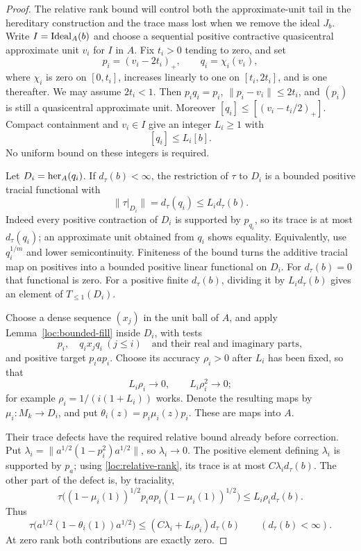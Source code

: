 \begin{proof}
The relative rank bound will control both the approximate-unit tail
in the hereditary construction and the trace mass lost when we remove
the ideal $J_b$.
Write $I=\operatorname{Ideal}_A(b)$ and choose a sequential positive contractive
quasicentral approximate unit $v_i$ for $I$ in $A$.  Fix $t_i>0$
tending to zero, and set
\[
 p_i=(v_i-2t_i)_+,\qquad q_i=\chi_i(v_i),
\]
where $\chi_i$ is zero on $[0,t_i]$, increases linearly to one on
$[t_i,2t_i]$, and is one thereafter.  We may assume $2t_i<1$.
Then $p_iq_i=p_i$, $\|p_i-v_i\|\le2t_i$, and $(p_i)$ is still a
quasicentral approximate unit.  Moreover
$[q_i]\le[(v_i-t_i/2)_+]$.  Compact containment and $v_i\in I$ give
an integer $L_i\ge1$ with
\begin{equation}\label{loc:hereditary-bound}
 [q_i]\le L_i[b].
\end{equation}
No uniform bound on these integers is required.

Let $D_i=\operatorname{her}_A(q_i)$.  If $d_\tau(b)<\infty$, the restriction of
$\tau$ to $D_i$ is a bounded positive tracial functional with
\begin{equation}\label{loc:trace-norm}
 \|\tau|_{D_i}\|=d_\tau(q_i)\le L_i d_\tau(b).
\end{equation}
Indeed every positive contraction of $D_i$ is supported by $p_{q_i}$,
so its trace is at most $d_\tau(q_i)$; an approximate unit obtained
from $q_i$ shows equality.  Equivalently, use $q_i^{1/m}$ and lower
semicontinuity.  Finiteness of the bound turns the additive tracial
map on positives into a bounded positive linear functional on $D_i$.
For $d_\tau(b)=0$ that functional is zero.  For a positive finite
$d_\tau(b)$, dividing it by $L_i d_\tau(b)$ gives an element of
$T_{\leq1}(D_i)$.

Choose a dense sequence $(x_j)$ in the unit ball of $A$, and apply
Lemma~\ref{loc:bounded-fill} inside $D_i$, with tests
\[
 p_i,\quad q_i x_j q_i\ (j\le i)
 \quad\text{and their real and imaginary parts},
\]
and positive target $p_iap_i$.  Choose its accuracy
$\rho_i>0$ after $L_i$ has been fixed, so that
\begin{equation}\label{loc:accuracy}
 L_i\rho_i\longrightarrow0,
 \qquad L_i\rho_i^2\longrightarrow0;
\end{equation}
for example $\rho_i=1/(i(1+L_i))$ works.  Denote the resulting maps
by $\mu_i:M_k\to D_i$, and put
$\theta_i(z)=p_i\mu_i(z)p_i$.  These are \cpc maps into $A$.

Their trace defects have the required relative bound already before
correction.  Put
$\lambda_i=\|a^{1/2}(1-p_i^2)a^{1/2}\|$, so $\lambda_i\to0$.
The positive element defining $\lambda_i$ is supported by $p_a$;
using \eqref{loc:relative-rank}, its trace is at most
$C\lambda_i d_\tau(b)$.  The other part of the defect is, by
traciality,
\[
 \tau\bigl((1-\mu_i(1))^{1/2}p_iap_i
                   (1-\mu_i(1))^{1/2}\bigr)
 \le L_i\rho_i d_\tau(b).
\]
Thus
\begin{equation}\label{loc:uncorrected-trace}
 \tau\bigl(a^{1/2}(1-\theta_i(1))a^{1/2}\bigr)
 \le(C\lambda_i+L_i\rho_i)d_\tau(b)
 \qquad(d_\tau(b)<\infty).
\end{equation}
At zero rank both contributions are exactly zero.


\end{proof}
